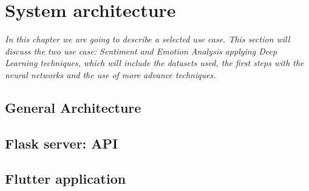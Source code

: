 \chapter{System architecture}
\label{chap:architecture}

\textit{In this chapter we are going to describe a selected use case. This section will discuss the two use case: Sentiment and Emotion Analysis applying Deep Learning techniques, which will include the datasets used, the first steps with the neural networks and the use of more advance techniques.}

\clearpage

\section{General Architecture}
\section{Flask server: API}

\section{Flutter application}

